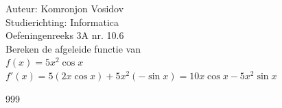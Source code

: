 \documentclass[a4paper]{article}
\begin{document}
	
	\noindent \large Auteur: Komronjon Vosidov \\
	\noindent \large Studierichting: Informatica\\
	\noindent \large Oefeningenreeks 3A nr. 10.6\\
	
	
	
	\normalsize
	Bereken de afgeleide functie van\\
	
	$f(x) = 5x^2 \cos x$\\
	
	$f'(x) = 5(2 x \cos x)+5x^2(-\sin x)=10x \cos x-5x^2 \sin x$\\
	
	
	
	
	\begin{thebibliography}{999}
	\end{thebibliography}	
	
\end{document}
